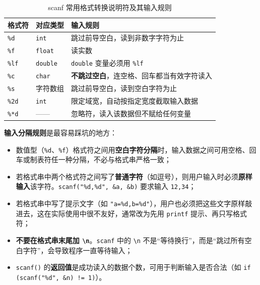 \begin{table}[htbp]
\centering
\caption{scanf 常用格式转换说明符及其输入规则}
\small
\begin{tabularx}{\textwidth}{@{}llX@{}}
\toprule
格式符 & 对应类型 & 输入规则 \\
\midrule
\texttt{\%d} & \texttt{int} & 跳过前导空白，读到非数字字符为止 \\
\texttt{\%f} & \texttt{float} & 读实数 \\
\texttt{\%lf} & \texttt{double} & \texttt{double} 变量必须用 \texttt{\%lf} \\
\texttt{\%c} & \texttt{char} & \textbf{不跳过空白}，连空格、回车都当有效字符读入 \\
\texttt{\%s} & 字符数组 & 跳过前导空白，读到空白字符为止 \\
\texttt{\%2d} & \texttt{int} & 限定域宽，自动按指定宽度截取输入数据 \\
\texttt{\%*d} & —— & 忽略符，读入该数据但不赋给任何变量 \\
\bottomrule
\end{tabularx}
\end{table}

\textbf{输入分隔规则}是最容易踩坑的地方：

\begin{itemize}
  \item 数值型（\texttt{\%d}、\texttt{\%f}）格式符之间用\textbf{空白字符分隔}时，输入数据之间可用空格、回车或制表符任一种分隔，不必与格式串严格一致；
  \item 若格式串中两个格式符之间写了\textbf{普通字符}（如逗号），则用户输入时必须\textbf{原样输入}该字符。\texttt{scanf("\%d,\%d", \&a, \&b)} 要求输入 \texttt{12,34}；
  \item 若格式串中写了提示文字（如 \texttt{"a=\%d,b=\%d"}），用户也必须把这些文字原样敲进去，这在实际使用中很不友好，通常改为先用 \texttt{printf} 提示、再只写格式符；
  \item \textbf{不要在格式串末尾加 \texttt{\textbackslash n}}。\texttt{scanf} 中的 \texttt{\textbackslash n} 不是“等待换行”，而是“跳过所有空白字符”，会导致程序一直等待输入；
  \item \texttt{scanf()} 的\textbf{返回值}是成功读入的数据个数，可用于判断输入是否合法（如 \texttt{if (scanf("\%d", \&n) != 1)}）。
\end{itemize}


